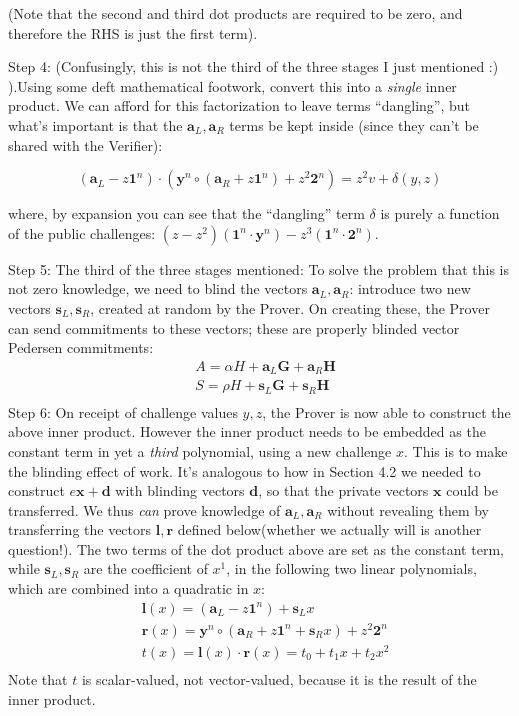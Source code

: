 \documentclass[10pt,a4paper]{article}
\begin{document}
(Note that the second and third dot products are required to be zero,
and therefore the RHS is just the first term).

Step 4: (Confusingly, this is not the third of the three stages I just
mentioned :) ).Using some deft mathematical footwork, convert this into
a \emph{single} inner product. We can afford for this factorization to
leave terms ``dangling'', but what's important is that the $\textbf{a}_L, \textbf{a}_R$ terms be kept
inside (since they can't be shared with the Verifier):

\[ \left(\textbf{a}_L - z\textbf{1}^n\right) \cdot \left(\textbf{y}^n \circ (\textbf{a}_R+z\textbf{1}^n) + z^2\textbf{2}^n\right) = z^2v + \delta(y, z) \]

where, by expansion you can see that the ``dangling'' term $\delta$ is purely a
function of the public challenges: $(z-z^2)(\textbf{1}^n\cdot\textbf{y}^n) - z^3(\textbf{1}^n\cdot\textbf{2}^n)$.

Step 5: The third of the three stages mentioned: To solve the problem
that this is not zero knowledge, we need to blind the vectors $\mathbf{a}_L, \mathbf{a}_R$: introduce
two new vectors $\mathbf{s}_L, \mathbf{s}_R$, created at random by the Prover. On creating these,
the Prover can send commitments to these vectors; these are properly
blinded vector Pedersen commitments:
\begin{align*}
&A = \alpha H + \textbf{a}_L\textbf{G} + \textbf{a}_R\textbf{H} \\
& S = \rho H + \textbf{s}_L\textbf{G} + \textbf{s}_R\textbf{H} \\
\end{align*}
Step 6: On receipt of challenge values $y, z$, the Prover is now able to
construct the above inner product. However the inner product needs to be
embedded as the constant term in yet a \emph{third} polynomial, using a
new challenge $x$. This is to make the blinding effect of work. It's
analogous to how in Section 4.2 we needed to construct $e\mathbf{x}+\mathbf{d}$ with blinding
vectors $\mathbf{d}$, so that the private vectors $\mathbf{x}$ could be transferred. We thus
\emph{can} prove knowledge of $\mathbf{a}_L, \mathbf{a}_R$ without revealing them by transferring the
vectors $\mathbf{l}, \mathbf{r}$ defined below(whether we actually will is another question!).
The two terms of the dot product above are set as the constant term,
while $\mathbf{s}_L, \mathbf{s}_R$ are the coefficient of $x^1$, in the following two linear polynomials,
which are combined into a quadratic in $x$:
\begin{align*}
& \textbf{l}(x) = \left(\textbf{a}_L - z\textbf{1}^n\right) + \textbf{s}_Lx \\
&  \textbf{r}(x) = \textbf{y}^n \circ (\textbf{a}_R + z\textbf{1}^n + \textbf{s}_Rx) + z^2\textbf{2}^n \\
& t(x) = \textbf{l}(x) \cdot \textbf{r}(x) = t_0 + t_1 x + t_2 x^2 \\
\end{align*}
Note that $t$ is scalar-valued, not vector-valued, because it is the result
of the inner product.
\end{document}
